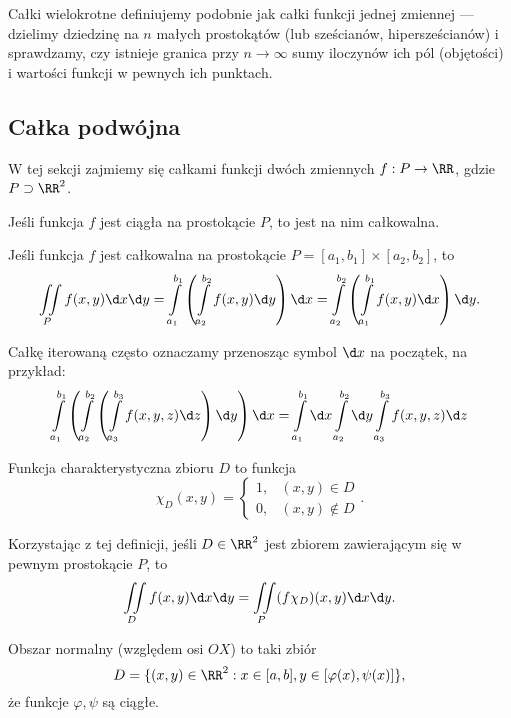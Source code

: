 Całki wielokrotne definiujemy podobnie jak całki funkcji jednej zmiennej --- dzielimy dziedzinę na $n$ małych prostokątów (lub sześcianów, hipersześcianów) i sprawdzamy, czy istnieje granica przy $n \to \infty$ sumy iloczynów ich pól (objętości) i wartości funkcji w pewnych ich punktach.

\subsection{Całka podwójna}
W tej sekcji zajmiemy się całkami funkcji dwóch zmiennych $f : P \to \RR$, gdzie $P \supset \RR^2$.

\begin{theorem}
    Jeśli funkcja $f$ jest ciągła na prostokącie $P$, to jest na nim całkowalna.
\end{theorem}

\begin{theorem}[Fubiniego]
    Jeśli funkcja $f$ jest całkowalna na prostokącie $P = [a_1, b_1] \times [a_2, b_2]$, to
    \[ \iint\limits_P f(x, y) \d x \d y = \int\limits_{a_1}^{b_1}\left(\int\limits_{a_2}^{b_2} f(x, y) \d y\right)\d x = \int\limits_{a_2}^{b_2}\left(\int\limits_{a_1}^{b_1} f(x, y) \d x\right)\d y. \]
\end{theorem}

Całkę iterowaną często oznaczamy przenosząc symbol $\d x$ na początek, na przykład:
\[ \int\limits_{a_1}^{b_1} \left(\int\limits_{a_2}^{b_2} \left(\int\limits_{a_3}^{b_3} f(x, y, z) \d z\right)\d y\right)\d x = \int\limits_{a_1}^{b_1} \d x\int\limits_{a_2}^{b_2} \d y \int\limits_{a_3}^{b_3} f(x, y, z) \d z \]

\begin{definition}
    Funkcja charakterystyczna zbioru $D$ to funkcja
    \[ \chi_D(x, y) = \begin{cases}
        1, & (x, y) \in D \\
        0, & (x, y) \notin D
    \end{cases}. \]
\end{definition}

Korzystając z tej definicji, jeśli $D \in \RR^2$ jest zbiorem zawierającym się w pewnym prostokącie $P$, to
\[ \iint\limits_D f(x, y) \d x \d y = \iint\limits_P (f\chi_D)(x, y) \d x \d y. \]

\begin{definition}
    Obszar normalny (względem osi $OX$) to taki zbiór
    \[ D = \{(x, y) \in \RR^2 : x \in [a, b], y \in [\varphi(x), \psi(x)]\}, \]
    że funkcje $\varphi, \psi$ są ciągłe.
\end{definition}

